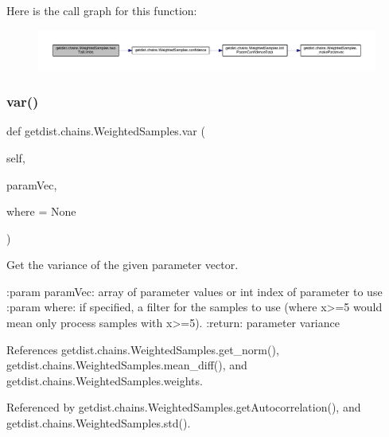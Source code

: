Here is the call graph for this function\+:
\nopagebreak
\begin{figure}[H]
\begin{center}
\leavevmode
\includegraphics[width=350pt]{classgetdist_1_1chains_1_1WeightedSamples_a85a7b24ea47b3ff8a4f1595e026abae4_cgraph}
\end{center}
\end{figure}
\mbox{\label{classgetdist_1_1chains_1_1WeightedSamples_a0ee200487592ebb5723da33f43724e4f}} 
\subsubsection{\texorpdfstring{var()}{var()}}
{\footnotesize\ttfamily def getdist.\+chains.\+Weighted\+Samples.\+var (\begin{DoxyParamCaption}\item[{}]{self,  }\item[{}]{param\+Vec,  }\item[{}]{where = {\ttfamily None} }\end{DoxyParamCaption})}

\begin{DoxyVerb}Get the variance of the given parameter vector.

:param paramVec: array of parameter values or int index of parameter to use
:param where: if specified, a filter for the samples to use (where x>=5 would mean only process samples with x>=5).
:return: parameter variance
\end{DoxyVerb}
 

References getdist.\+chains.\+Weighted\+Samples.\+get\+\_\+norm(), getdist.\+chains.\+Weighted\+Samples.\+mean\+\_\+diff(), and getdist.\+chains.\+Weighted\+Samples.\+weights.



Referenced by getdist.\+chains.\+Weighted\+Samples.\+get\+Autocorrelation(), and getdist.\+chains.\+Weighted\+Samples.\+std().

